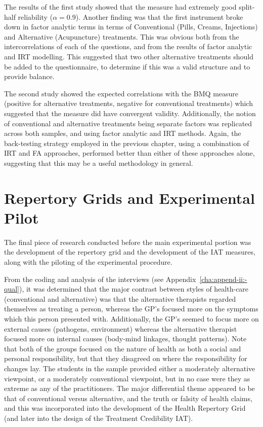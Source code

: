The results of the first study showed that the measure had extremely
good split-half reliability ($ \alpha=0.9$). Another finding was that
the first instrument broke down in factor analytic terms in terms of
Conventional (Pills, Creams, Injections) and Alternative (Acupuncture)
treatments. This was obvious both from the intercorrelations of each
of the questions, and from the results of factor analytic and IRT
modelling. This suggested that two other alternative treatments should
be added to the questionnaire, to determine if this was a valid
structure and to provide balance.

The second study showed the expected correlations with the BMQ measure
(positive for alternative treatments, negative for conventional
treatments) which suggested that the measure did have convergent
validity. Additionally, the notion of conventional and alternative
treatments being separate factors was replicated across both samples,
and using factor analytic and IRT methods. Again, the back-testing
strategy employed in the previous chapter, using a combination of IRT
and FA approaches, performed better than either of these approaches
alone, suggesting that this may be a useful methodology in general.


\section{Repertory Grids and Experimental Pilot}
\label{sec:qual-rese-rep}

The final piece of research conducted before the main experimental
portion was the development of the repertory grid and the development
of the IAT measures, along with the piloting of the experimental
procedure.

From the coding and analysis of the interviews (see
Appendix~\ref{cha:append-ii:-qual}), it was determined that the major
contrast between styles of health-care (conventional and alternative)
was that the alternative therapists regarded themselves as treating a
person, whereas the GP's focused more on the symptoms which this
person presented with. Additionally, the GP's seemed to focus more on
external causes (pathogens, environment) whereas the alternative
therapist focused more on internal causes (body-mind linkages, thought
patterns). Note that both of the groups focused on the nature of
health as both a social and personal responsibility, but that they
disagreed on where the responsibility for changes lay. The students in
the sample provided either a moderately alternative viewpoint, or a
moderately conventional viewpoint, but in no case were they as extreme
as any of the practitioners. The major differential theme appeared to
be that of conventional versus alternative, and the truth or falsity
of health claims, and this was incorporated into the development of
the Health Repertory Grid (and later into the design of the Treatment
Credibility IAT).

